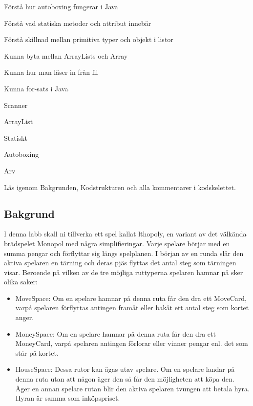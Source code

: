 

\Teamlab{\LabWeekELEVEN}

\begin{Goals}
\item Förstå hur autoboxing fungerar i Java
\item Förstå vad statiska metoder och attribut innebär
\item Förstå skillnad mellan primitiva typer och objekt i listor
\item Kunna byta mellan ArrayLists och Array
\item Kunna hur man läser in från fil
\item Kunna for-sats i Java
\end{Goals}

\begin{Preparations}
\item Scanner
\item ArrayList
\item Statiskt
\item Autoboxing
\item Arv
\item Läs igenom Bakgrunden, Kodstrukturen och alla kommentarer i kodskelettet.

\end{Preparations}

\subsection{Bakgrund}
I denna labb skall ni tillverka ett spel kallat lthopoly, en variant av det välkända brädspelet Monopol med några simplifieringar. Varje spelare börjar med en summa pengar och förflyttar sig längs spelplanen.
I början av en runda slår den aktiva spelaren en tärning och deras pjäs flyttas det antal steg som tärningen visar. 
Beroende på vilken av de tre möjliga ruttyperna spelaren hamnar på sker olika saker:

\begin{itemize}
\item MoveSpace: Om en spelare hamnar på denna ruta får den dra ett MoveCard, varpå spelaren förflyttas antingen framåt eller bakåt ett antal steg som kortet anger.
\item MoneySpace: Om en spelare hamnar på denna ruta får den dra ett MoneyCard, varpå spelaren antingen förlorar eller vinner pengar enl. det som står på kortet.
\item HouseSpace: Dessa rutor kan ägas utav spelare. Om en spelare landar på denna ruta utan att någon äger den så får den möjligheten att köpa den. Äger en annan spelare rutan blir den aktiva spelaren tvungen att betala hyra. Hyran är samma som inköpspriset.
\end{itemize}


